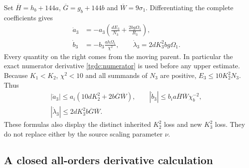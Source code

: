 \documentclass[11pt]{article}
\begin{document}
Set $\overline H=h_b+144a$, $\overline G=g_b+144b$ and
$\overline W=9\sigma_1$. Differentiating the complete coefficients
gives
\begin{equation}\label{tgdc:coefficient_rates}
\begin{aligned}
 \dot a_3&=-a_3\left(\frac{dE_3}{N_3}
                            +\frac{2bg\Omega_1}{R_3}\right),\\
 \dot b_3&=-b_3\frac{ah\Omega_1}{\chi^2},\qquad
 \dot\lambda_3=2dK_3^2bg\Omega_1.
\end{aligned}
\end{equation}
Every quantity on the right comes from the moving parent. In particular
the exact numerator derivative \eqref{tgdc:numerator} is used before
any upper estimate. Because $K_1<K_2$, $\chi^2<10$ and all summands
of $N_3$ are positive, $E_3\leq10K_2^2N_3$. Thus
\begin{equation}\label{tgdc:coefficient_rate_bounds}
\begin{gathered}
 |\dot a_3|\leq
 a_i(10dK_2^2+2b\overline G\overline W),\qquad
 |\dot b_3|\leq
 b_i a\overline H\overline W\chi_b^{-2},\\
 |\dot\lambda_3|\leq
 2dK_3^2 b\overline G\overline W.
\end{gathered}
\end{equation}
These formulas also display the distinct inherited $K_2^2$ loss and
new $K_3^2$ loss. They do not replace either by the source scaling
parameter $\nu$.

\subsection{A closed all-orders derivative calculation}
\end{document}
